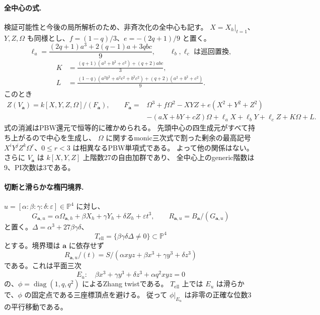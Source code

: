 \paragraph{全中心の式.}
検証可能性と今後の局所解析のため、非斉次化の全中心も記す。
$X=X_h|_{t=1}$、$Y,Z,\Omega$ も同様とし、$f=(1-q)/3$、$e=-(2q+1)/9$ と置く。
\[
 \ell_a=\frac{(2q+1)a^3+2(q-1)a+3qbc}{9},
 \qquad \ell_b,\ell_c\text{ は巡回置換},
\]
\begin{align*}
 K&=\frac{(q+1)(a^2+b^2+c^2)+(q+2)abc}{3},\\
 L&=\frac{(1-q)(a^2b^2+a^2c^2+b^2c^2)+(q+2)(a^2+b^2+c^2)}9.
\end{align*}
このとき
\begin{equation}\label{eq:triangle-deform-full-center}
\begin{split}
 Z(V_{\boldsymbol a})=k[X,Y,Z,\Omega]/(F_{\boldsymbol a}),\qquad
 F_{\boldsymbol a}={}&\Omega^3+f\Omega^2-XYZ+e(X^2+Y^2+Z^2)\\
 &-(aX+bY+cZ)\Omega+\ell_aX+\ell_bY+\ell_cZ+K\Omega+L.
\end{split}
\end{equation}
式の消滅はPBW還元で恒等的に確かめられる。
先頭中心の四生成元がすべて持ち上がるので中心を生成し、
$\Omega$ に関するmonic三次式で割った剰余の最高記号
$X^iY^jZ^k\Omega^r$、$0\le r<3$ は相異なるPBW単項式である。
よって他の関係はない。さらに $V_{\boldsymbol a}$ は $k[X,Y,Z]$ 上階数27の自由加群であり、
全中心上のgeneric階数は9、PI次数は3である。

\paragraph{切断と滑らかな楕円境界.}
$u=[\alpha:\beta:\gamma:\delta:\varepsilon]\in\mathbb P^4$ に対し、
\[
 G_{\boldsymbol a,u}=\alpha\Omega_{\boldsymbol a,h}
       +\beta X_h+\gamma Y_h+\delta Z_h+\varepsilon t^3,
 \qquad R_{\boldsymbol a,u}=B_{\boldsymbol a}/(G_{\boldsymbol a,u})
\]
と置く。$\Delta=\alpha^3+27\beta\gamma\delta$、
\[
 T_{\mathrm{ell}}=\{\beta\gamma\delta\Delta\ne0\}\subset\mathbb P^4
\]
とする。境界環は $\boldsymbol a$ に依存せず
\[
 R_{\boldsymbol a,u}/(t)=S/(\alpha xyz+\beta x^3+\gamma y^3+\delta z^3)
\]
である。これは平面三次
\[
 E_u:\quad\beta x^3+\gamma y^3+\delta z^3+\alpha q^2xyz=0
\]
の、$\phi=\operatorname{diag}(1,q,q^2)$ によるZhang twistである。
$T_{\mathrm{ell}}$ 上では $E_u$ は滑らかで、$\phi$ の固定点である三座標頂点を避ける。
従って $\phi|_{E_u}$ は非零の正確な位数3の平行移動である。

